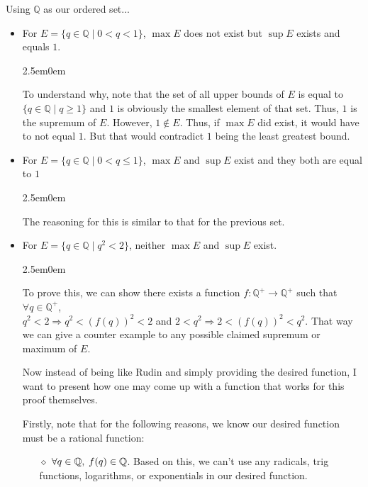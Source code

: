 \documentclass{book}
\newcommand{\exOneOld}{%
   \color{Purple}%
   \fontsize{14}{14}\selectfont%
}
\newcommand{\exP}{%
   \color{VioletRed}%
   \fontsize{12}{12}\selectfont%
}
\newenvironment{myIndent}{%
   \begin{adjustwidth}{2.5em}{0em}%
}{%
   \end{adjustwidth}%
}
\begin{document}
   \pagebreak
   \exOneOld
   Using $\mathbb{Q}$ as our ordered set...
   \begin{itemize}
      \item For $E = \{q \in \mathbb{Q} \mid 0<q<1\}$,
      $\max{E}$ does not exist but $\sup{E}$ exists and equals $1$.
      \exP
      \begin{myIndent}
         To understand why, note that the set of all upper bounds
         of $E$ is equal to\\ $\{q \in \mathbb{Q} \mid q \geq 1\}$ and 
         $1$ is obviously the smallest element of that set. Thus, $1$
         is the supremum of $E$. However, $1 \notin E$. Thus, if
         $\max{E}$ did exist, it would have to not equal $1$. But that
         would contradict $1$ being the least greatest bound.
      \end{myIndent}
      \hfill \bigbreak

      \exOneOld
      \item For $E = \{q \in \mathbb{Q} \mid 0<q \leq 1\}$,
      $\max{E}$ and $\sup{E}$ exist and they both are equal to $1$
      \exP
      \begin{myIndent}
         The reasoning for this is similar to that for the previous set.
      \end{myIndent}
      \hfill \bigbreak
      
      \exOneOld
      \item For $E = \{q \in \mathbb{Q} \mid q^2 < 2\}$, neither
      $\max{E}$ and $\sup{E}$ exist.
      \exP
      \begin{myIndent}
         To prove this, we can show there exists a function $f:
         \mathbb{Q}^+\rightarrow\mathbb{Q}^+$ such that
         $\forall q \in \mathbb{Q}^+$,\\ $q^2 < 2
         \Rightarrow q^2 < (f(q))^2 < 2$ and $2 < q^2
         \Rightarrow 2 < (f(q))^2 < q^2$. That way we can give
         a counter example to any possible claimed supremum or 
         maximum of $E$.
         \hfill \bigbreak


         Now instead of being like Rudin and simply providing the desired
         function, I want to present how one may come up with a function 
         that works for this proof themselves.
         \hfill \bigbreak

         Firstly, note that for the following reasons, we know our 
         desired function must be a rational function:
         \begin{itemize}
            \item[$\diamond$] $\forall q \in \mathbb{Q}, \hspace{0.25em} 
            f(q) \in \mathbb{Q}$. Based on this, we can't use any radicals,
            trig functions, logarithms, or exponentials in our desired
            function. \hfill \bigbreak


\end{itemize}
\end{myIndent}
\end{itemize}
\end{document}

